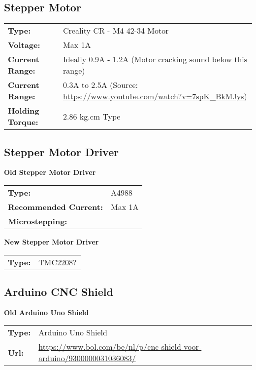 \subsection{Stepper Motor}


\begin{tabular}{@{}ll}
    \textbf{Type:} & Creality CR - M4 42-34 Motor \\
    \textbf{Voltage:} & Max 1A \\
    \textbf{Current Range:} & Ideally 0.9A - 1.2A (Motor cracking sound below this range) \\
    \textbf{Current Range:} & 0.3A to 2.5A (Source: \url{https://www.youtube.com/watch?v=7spK_BkMJys}) \\
    \textbf{Holding Torque:} & 2.86 kg.cm Type \\
\end{tabular}


\subsection{Stepper Motor Driver}

\textbf{Old Stepper Motor Driver}

\begin{tabular}{@{}ll}
    \textbf{Type:} & A4988 \\
    \textbf{Recommended Current:} & Max 1A \\
    \textbf{Microstepping:} & \\
\end{tabular}

\noindent
\textbf{New Stepper Motor Driver}

\begin{tabular}{@{}ll}
    \textbf{Type:} & TMC2208? \\
\end{tabular}


\subsection{Arduino CNC Shield}

\textbf{Old Arduino Uno Shield}

\begin{tabular}{@{}ll}
    \textbf{Type:} & Arduino Uno Shield \\
    \textbf{Url:} & \url{https://www.bol.com/be/nl/p/cnc-shield-voor-arduino/9300000031036083/} \\
\end{tabular}

